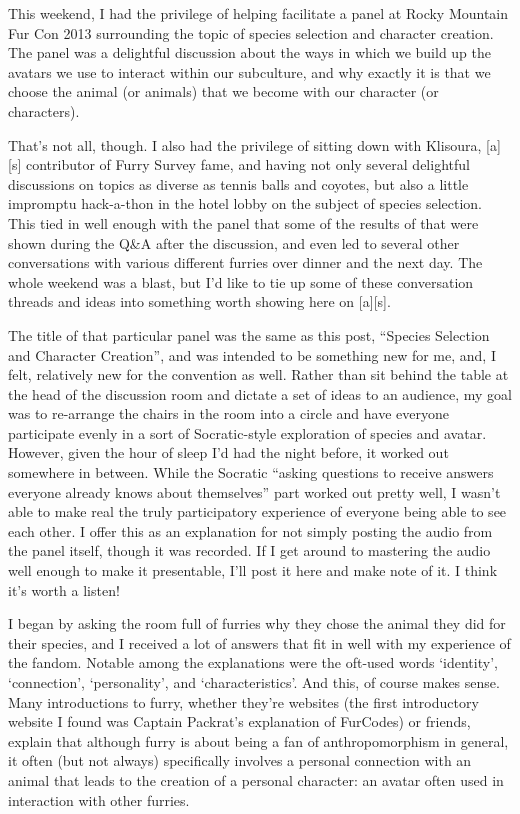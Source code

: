 
This weekend, I had the privilege of helping facilitate a panel at Rocky Mountain Fur Con 2013 surrounding the topic of species selection and character creation. The panel was a delightful discussion about the ways in which we build up the avatars we use to interact within our subculture, and why exactly it is that we choose the animal (or animals) that we become with our character (or characters).

That's not all, though. I also had the privilege of sitting down with Klisoura, {[}a{]}{[}s{]} contributor of Furry Survey fame, and having not only several delightful discussions on topics as diverse as tennis balls and coyotes, but also a little impromptu hack-a-thon in the hotel lobby on the subject of species selection. This tied in well enough with the panel that some of the results of that were shown during the Q\&A after the discussion, and even led to several other conversations with various different furries over dinner and the next day. The whole weekend was a blast, but I'd like to tie up some of these conversation threads and ideas into something worth showing here on {[}a{]}{[}s{]}.

The title of that particular panel was the same as this post, ``Species Selection and Character Creation'', and was intended to be something new for me, and, I felt, relatively new for the convention as well. Rather than sit behind the table at the head of the discussion room and dictate a set of ideas to an audience, my goal was to re-arrange the chairs in the room into a circle and have everyone participate evenly in a sort of Socratic-style exploration of species and avatar. However, given the hour of sleep I'd had the night before, it worked out somewhere in between. While the Socratic ``asking questions to receive answers everyone already knows about themselves'' part worked out pretty well, I wasn't able to make real the truly participatory experience of everyone being able to see each other. I offer this as an explanation for not simply posting the audio from the panel itself, though it was recorded. If I get around to mastering the audio well enough to make it presentable, I'll post it here and make note of it. I think it's worth a listen!

I began by asking the room full of furries why they chose the animal they did for their species, and I received a lot of answers that fit in well with my experience of the fandom. Notable among the explanations were the oft-used words `identity', `connection', `personality', and `characteristics'. And this, of course makes sense. Many introductions to furry, whether they're websites (the first introductory website I found was Captain Packrat's explanation of FurCodes) or friends, explain that although furry is about being a fan of anthropomorphism in general, it often (but not always) specifically involves a personal connection with an animal that leads to the creation of a personal character: an avatar often used in interaction with other furries.

